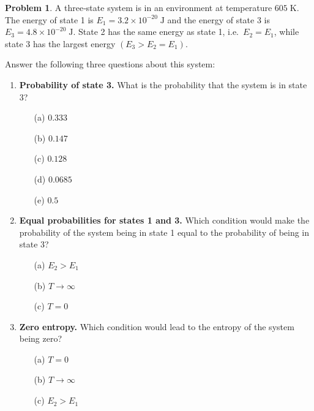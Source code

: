 \documentclass[10pt]{article}
\theoremstyle{definition} %
\newtheorem{problem}{Problem}
\theoremstyle{plain} %
\begin{document}
            \begin{problem}
              A three‐state system is in an environment at temperature \(605\;\text{K}\).
              The energy of state 1 is \(E_{1}=3.2\times10^{-20}\;\text{J}\) and the energy of
              state 3 is \(E_{3}=4.8\times10^{-20}\;\text{J}\).
              State 2 has the same energy as state 1, i.e.\ \(E_{2}=E_{1}\), while state 3
              has the largest energy \((E_{3}>E_{2}=E_{1})\).
              
              \medskip
              Answer the following three questions about this system:
              
              \begin{enumerate}
                \item \textbf{Probability of state 3.}\;
                      What is the probability that the system is in state 3?
                      \begin{enumerate}
                        \item[(a)] \(0.333\)
                        \item[(b)] \(0.147\)
                        \item[(c)] \(0.128\)
                        \item[(d)] \(0.0685\)
                        \item[(e)] \(0.5\)
                      \end{enumerate}
              
                \item \textbf{Equal probabilities for states 1 and 3.}\;
                      Which condition would make the probability of the system being in
                      state 1 equal to the probability of being in state 3?
                      \begin{enumerate}
                        \item[(a)] \(E_{2} > E_{1}\)
                        \item[(b)] \(T \to \infty\)
                        \item[(c)] \(T = 0\)
                      \end{enumerate}
              
                \item \textbf{Zero entropy.}\;
                      Which condition would lead to the entropy of the system being zero?
                      \begin{enumerate}
                        \item[(a)] \(T = 0\)
                        \item[(b)] \(T \to \infty\)
                        \item[(c)] \(E_{2} > E_{1}\)
                      \end{enumerate}
              \end{enumerate}
              \end{problem}
\end{document}
